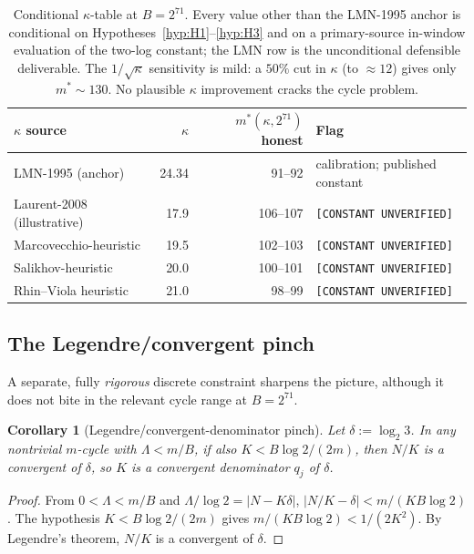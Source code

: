 \documentclass[11pt]{amsart}
\newtheorem{corollary}[theorem]{Corollary}
\theoremstyle{definition}
\theoremstyle{remark}
\begin{document}
\begin{table}[t]
\centering
\begin{tabular}{@{}lrrl@{}}
\toprule
$\kappa$ source & $\kappa$ & $m^*(\kappa,2^{71})$ honest & Flag\\
\midrule
LMN-1995 (anchor)~\citep{lmn1995}        & 24.34 & 91--92 & calibration; published constant \\
Laurent-2008 (illustrative)~\citep{laurent2008}    & 17.9 & 106--107 & \texttt{[CONSTANT UNVERIFIED]} \\
Marcovecchio-heuristic~\citep{marcovecchio2009}  & 19.5 & 102--103 & \texttt{[CONSTANT UNVERIFIED]} \\
Salikhov-heuristic~\citep{salikhov2007}         & 20.0 & 100--101 & \texttt{[CONSTANT UNVERIFIED]} \\
Rhin--Viola heuristic~\citep{rhinviola1996}    & 21.0 & 98--99   & \texttt{[CONSTANT UNVERIFIED]} \\
\bottomrule
\end{tabular}
\caption{Conditional $\kappa$-table at $B=2^{71}$. Every value other than the LMN-1995 anchor is
conditional on Hypotheses~\ref{hyp:H1}--\ref{hyp:H3} and on a primary-source in-window evaluation
of the two-log constant; the LMN row is the unconditional defensible deliverable. The
$1/\sqrt{\kappa}$ sensitivity is mild: a $50\%$ cut in $\kappa$ (to $\approx 12$) gives only
$m^*\sim 130$. No plausible $\kappa$ improvement cracks the cycle problem.}
\label{tab:kappa}
\end{table}

\subsection{The Legendre/convergent pinch}

A separate, fully \emph{rigorous} discrete constraint sharpens the picture, although it does
not bite in the relevant cycle range at $B=2^{71}$.

\begin{corollary}[Legendre/convergent-denominator pinch]\label{cor:legendre}
Let $\delta:=\log_2 3$. In any nontrivial $m$-cycle with $\Lambda<m/B$, if also
$K<B\log 2/(2m)$, then $N/K$ is a convergent of $\delta$, so $K$ is a convergent denominator
$q_j$ of $\delta$.
\end{corollary}

\begin{proof}
From $0<\Lambda<m/B$ and $\Lambda/\log 2=|N-K\delta|$, $|N/K-\delta|<m/(KB\log 2)$. The
hypothesis $K<B\log 2/(2m)$ gives $m/(KB\log 2)<1/(2K^2)$. By Legendre's theorem, $N/K$ is a
convergent of $\delta$.
\end{proof}
\end{document}

